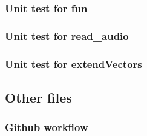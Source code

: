\documentclass[a4paper,12pt]{article}
\begin{document}
\subsubsection*{Unit test for fun}

\subsubsection*{Unit test for read\_audio}

\subsubsection*{Unit test for extendVectors}


\pagebreak
\subsection*{Other files}
\subsubsection*{Github workflow}

\end{document}
